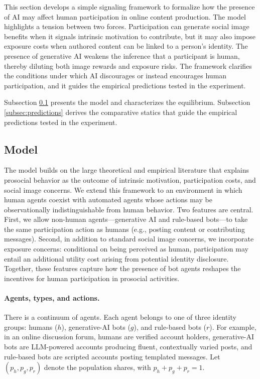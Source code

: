 \documentclass[12pt,notitlepage]{article}
\theoremstyle{plain}
\theoremstyle{plain}
\theoremstyle{definition}
\theoremstyle{definition}
\theoremstyle{assumption}
\theoremstyle{plain}
\theoremstyle{plain}
\theoremstyle{plain}
\theoremstyle{plain}
\theoremstyle{definition}%
\theoremstyle{plain}
\theoremstyle{plain}
\theoremstyle{plain}
\theoremstyle{plain}
\begin{document}
This section develops a simple signaling framework to formalize how the presence of AI may affect human participation in online content production. The model highlights a tension between two forces. Participation can generate social image benefits when it signals intrinsic motivation to contribute, but it may also impose exposure costs when authored content can be linked to a person's identity. The presence of generative AI weakens the inference that a participant is human, thereby diluting both image rewards and exposure risks. The framework clarifies the conditions under which AI discourages or instead encourages human participation, and it guides the empirical predictions tested in the experiment.

Subsection \ref{subsec:model} presents the model and characterizes the equilibrium. Subsection \ref{subsec:predictions} derives the comparative statics that guide the empirical predictions tested in the experiment.

\subsection{Model} \label{subsec:model}

The model builds on the large theoretical and empirical literature that explains prosocial behavior as the outcome of intrinsic motivation, participation costs, and social image concerns. We extend this framework to an environment in which human agents coexist with automated agents whose actions may be observationally indistinguishable from human behavior. Two features are central. First, we allow non-human agents---generative AI and rule-based bots---to take the same participation action as humans (e.g., posting content or contributing messages). Second, in addition to standard social image concerns, we incorporate exposure concerns: conditional on being perceived as human, participation may entail an additional utility cost arising from potential identity disclosure. Together, these features capture how the presence of bot agents reshapes the incentives for human participation in prosocial activities.


\paragraph{Agents, types, and actions.} There is a continuum of agents. Each agent belongs to one of three identity groups: humans ($h$), generative-AI bots ($g$), and rule-based bots ($r$). For example, in an online discussion forum, humans are verified account holders, generative-AI bots are LLM-powered accounts producing fluent, contextually varied posts, and rule-based bots are scripted accounts posting templated messages. Let $(p_h,p_g,p_r)$ denote the population shares, with $p_h+p_g+p_r=1$.
\end{document}
